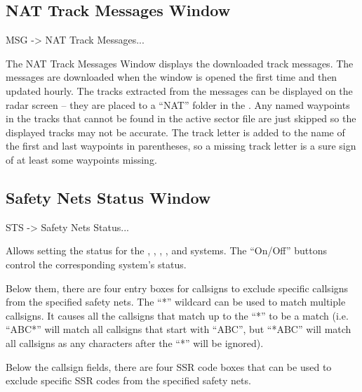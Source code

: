 \documentclass[a4paper,oneside,11pt]{memoir}
\begin{document}
\subsection{NAT Track Messages Window}
\label{win:nattmw}

 MSG -> NAT Track Messages...

\bigskip


The NAT Track Messages Window displays the downloaded track messages. The messages are downloaded when the window is opened the first time and then updated hourly. The tracks extracted from the messages can be displayed on the radar screen – they are placed to a “NAT” folder in the . Any named waypoints in the tracks that cannot be found in the active sector file are just skipped so the displayed tracks may not be accurate. The track letter is added to the name of the first and last waypoints in parentheses, so a missing track letter is a sure sign of at least some waypoints missing.

\subsection{Safety Nets Status Window}
\label{win:snsw}

 STS -> Safety Nets Status...

\bigskip


Allows setting the status for the , , , ,  and  systems. The “On/Off” buttons control the corresponding system’s status.

\bigskip

Below them, there are four entry boxes for callsigns to exclude specific callsigns from the specified safety nets. The “*” wildcard can be used to match multiple callsigns. It causes all the callsigns that match up to the “*” to be a match (i.e. “ABC*” will match all callsigns that start with “ABC”, but “*ABC” will match all callsigns as any characters after the “*” will be ignored).

\bigskip

Below the callsign fields, there are four SSR code boxes that can be used to exclude specific SSR codes from the specified safety nets.
\end{document}
